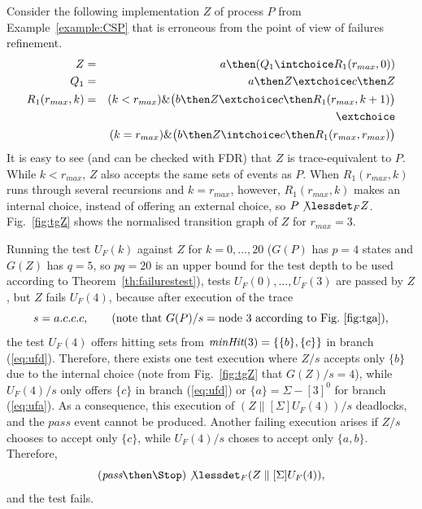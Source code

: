 \begin{example}
\label{ex:uf1tests} Consider the following implementation $Z$ of process $P$
from Example~\ref{example:CSP} that is erroneous from the point of view of
failures refinement.
\begin{eqnarray*}
Z & = & a \then (Q_1 \intchoice R_1(r_{max},0))
\\
Q_1 & = & a\then Z \extchoice c\then Z
\\
R_1(r_{max},k) & = & (k < r_{max}) \& \big(b\then Z \extchoice  c\then R_1(r_{max},k+1)\big)
\\ & & \extchoice
\\ & & (k = r_{max}) \& \big(b\then Z \intchoice c\then R_1(r_{max},r_{max})\big)
\end{eqnarray*}
It is easy to see (and can be checked with FDR) that $Z$ is trace-equivalent
to $P$. While $k < r_{max}$, $Z$ also accepts the same sets of events as $P$.
When $R_1(r_{max},k)$ runs through several recursions and $k = r_{max}$,
however, $R_1(r_{max},k)$ makes an internal choice, instead of offering an
external choice, so $P\not\lessdet_F Z$. Fig.~\ref{fig:tgZ} shows the
normalised transition graph of $Z$ for $r_{max} = 3$.



Running the test $U_F(k)$ against $Z$ for $k=0,\dots,20$ ($G(P)$ has $p = 4$
states and $G(Z)$ has $q=5$, so $pq=20$ is an upper bound for the test depth
to be used according to Theorem~\ref{th:failurestest}), tests $U_F(0),\dots,
U_F(3)$ are passed by $Z$, but $Z$ fails $U_F(4)$, because after execution of
the trace
\[
s = a.c.c.c, \qquad\text{(note that $G(P)/s = \text{node}\ 3$ according to Fig.~\ref{fig:tga})},
\]
the test $U_F(4)$ offers hitting sets from $\text{\it minHit}(3) = \{\{b\},\{c\}\}$
in branch (\ref{eq:ufd}). Therefore,  there exists one test execution
where $Z/s$ accepts only $\{b\}$ due to the internal choice (note
from Fig.~\ref{fig:tgZ} that
$G(Z)/s = 4$), while $U_F(4)/s$
only offers $\{c\}$ in branch (\ref{eq:ufd}) or $\{ a\} = \Sigma - [3]^0$ for
branch (\ref{eq:ufa}).  As a consequence, this execution of
$(Z\parallel[\Sigma] U_F(4))/s$ deadlocks, and the $pass$ event cannot be
produced. Another failing execution arises if $Z/s$ chooses to accept only
$\{c \}$, while $U_F(4)/s$ choses to accept only $\{a,b\}$. Therefore,
\[
(\epass\then \Stop)\not\lessdet_F  (Z\parallel[\Sigma] U_F(4)),
\]
 and the test fails. \xbox
\end{example}

